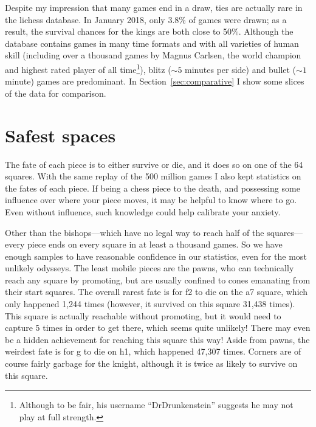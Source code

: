\documentclass[twocolumn]{article}
\begin{document}
Despite my impression that many games end in a draw, ties are actually
rare in the lichess database. In January 2018, only 3.8\% of games
were drawn;
as a result, the survival chances for the kings are both close to
50\%. Although the database contains games in many time formats and
with all varieties of human skill (including over a thousand games by
Magnus Carlsen, the world champion and highest rated player of all
time\footnote{Although to be fair, his username ``DrDrunkenstein''
  suggests he may not play at full strength.}), blitz ($\sim 5$ minutes
per side) and bullet ($\sim 1$ minute) games are predominant. In
Section~\ref{sec:comparative} I show some slices of the data for
comparison. %

\section{Safest spaces}

The fate of each piece is to either survive or die, and it does so on
one of the 64 squares. With the same replay of the 500 million games
I also kept statistics on the fates of each piece. If being a chess
piece to the death, and possessing some influence over where your piece
moves, it may be helpful to know where to go. Even without influence,
such knowledge could help calibrate your anxiety.

Other than the bishops---which have no legal way to reach half of the
squares---every piece ends on every square in at least a thousand
games. So we have enough samples to have reasonable confidence in our
statistics, even for the most unlikely odysseys. The least mobile
pieces are the pawns, who can technically reach any square by
promoting, but are usually confined to cones emanating from their
start squares. The overall rarest fate is for \pawn f2 to die on the
a7 square, which only happened 1,244 times (however, it survived on
this square 31,438 times). This square is actually reachable without
promoting, but it would need to capture 5 times in order to get
there, which seems quite unlikely! There may even be a hidden
achievement for reaching this square this way!
Aside from pawns, the weirdest fate is for \knight g to die on h1,
which happened 47,307 times. Corners are of course fairly garbage for
the knight, although it is twice as likely to survive on this square.
\end{document}
